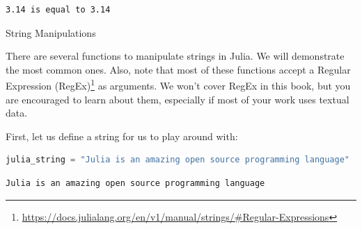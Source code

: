 \documentclass[
  notoc %
]{tufte-book}
\makeatletter
\DeclareRobustCommand{\href}[2]{#2\footnote{\url{#1}}}
\renewcommand\subsubsection{%
\@startsection{subsubsection}{3}{\z@ }{-3.25ex\@plus -1ex \@minus -.2ex}{1.5ex \@plus .2ex}{\normalfont \normalsize \bfseries }
}
\makeatother
\begin{document}
\begin{lstlisting}[language=Output]
3.14 is equal to 3.14
\end{lstlisting}

\hypertarget{sec:string_manipulations}{%
\subsubsection{String Manipulations}\label{sec:string_manipulations}}

There are several functions to manipulate strings in Julia. We will
demonstrate the most common ones. Also, note that most of these
functions accept a
\href{https://docs.julialang.org/en/v1/manual/strings/\#Regular-Expressions}{Regular
Expression (RegEx)} as arguments. We won't cover RegEx in this book, but
you are encouraged to learn about them, especially if most of your work
uses textual data.

First, let us define a string for us to play around with:

\begin{lstlisting}[language=Julia]
julia_string = "Julia is an amazing open source programming language"
\end{lstlisting}

\begin{lstlisting}[language=Output]
Julia is an amazing open source programming language
\end{lstlisting}
\end{document}
